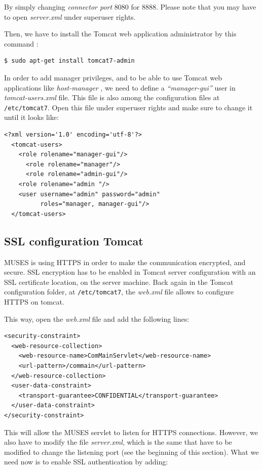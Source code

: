By simply changing \textit{connector port} 8080 for 8888. Please note that you may have to open \textit{server.xml} under superuser rights.

Then, we have to install the Tomcat web application administrator by this command \cite{tomcatdocu:site}:

\begin{verbatim}
$ sudo apt-get install tomcat7-admin
\end{verbatim}

In order to add manager privileges, and to be able to use Tomcat web applications like \textit{host-manager} \cite{tomcatdocu:site}, we need to define a \textit{``manager-gui''} user in \textit{tomcat-users.xml} file. This file is also among the configuration files at \texttt{/etc/tomcat7}. Open this file under superuser rights and make sure to change it until it looks like:

\begin{verbatim}
<?xml version='1.0' encoding='utf-8'?>
  <tomcat-users>
    <role rolename="manager-gui"/>
 	  <role rolename="manager"/>
 	  <role rolename="admin-gui"/>
    <role rolename="admin "/>
    <user username="admin" password="admin"
          roles="manager, manager-gui"/>
  </tomcat-users>
\end{verbatim}

\subsection{SSL configuration Tomcat}
\label{subsec:ssltomcat}

MUSES is using HTTPS in order to make the communication encrypted, and secure. SSL encryption has to be enabled in Tomcat server configuration with an SSL certificate location, on the server machine. Back again in the Tomcat configuration folder, at \texttt{/etc/tomcat7}, the \textit{web.xml} file allows to configure HTTPS on tomcat.

This way, open the \textit{web.xml} file and add the following lines:

\begin{verbatim}
<security-constraint>
  <web-resource-collection>
    <web-resource-name>ComMainServlet</web-resource-name>
    <url-pattern>/commain</url-pattern>
  </web-resource-collection>
  <user-data-constraint>
    <transport-guarantee>CONFIDENTIAL</transport-guarantee>
  </user-data-constraint>
</security-constraint>
\end{verbatim}

This will allow the MUSES servlet to listen for HTTPS connections. However, we also have to modify the file \textit{server.xml}, which is the same that have to be modified to change the listening port (see the beginning of this section). What we need now is to enable SSL authentication by adding:

